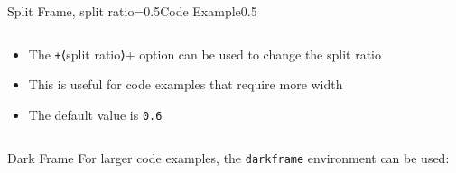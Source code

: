\begin{splitframe}[fragile]{Split Frame, split ratio=0.5}{Code Example}{0.5}
  \begin{columns}[t]
    \begin{column}{0.48\textwidth}
      \begin{itemize}
        \setlength{\itemsep}{1em}
        \item The \texttt+{⟨split ratio⟩}+ option can be used to change
          the split ratio
        \item This is useful for code examples that require more width
        \item The default value is \texttt{0.6}
      \end{itemize}
    \end{column}
    \hfill
    \begin{column}{0.48\textwidth}
      \color{cwhite}
      \inputminted{latex}{content/example_split_frame_var.tex}
    \end{column}
  \end{columns}
\end{splitframe}

\begin{darkframe}[fragile]{Dark Frame}
  For larger code examples, the \texttt{darkframe} environment can be used:
  \begin{center}
    \inputminted{latex}{content/example_dark_frame.tex}
  \end{center}
\end{darkframe}
